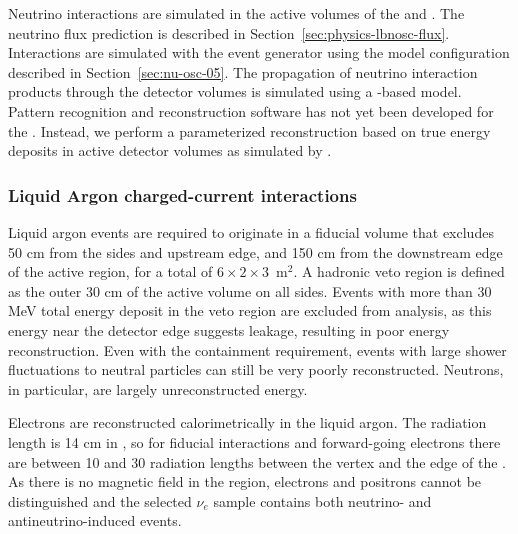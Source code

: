 Neutrino interactions are simulated in the active volumes of the  and  . The neutrino flux prediction is described in Section~\ref{sec:physics-lbnosc-flux}. Interactions are simulated with the  event generator using the model configuration described in Section~\ref{sec:nu-osc-05}. The propagation of neutrino interaction products through the detector volumes is simulated using a -based model. Pattern recognition and reconstruction software has not yet been developed for the . Instead, we perform a parameterized reconstruction based on true energy deposits in active detector volumes as simulated by .

\subsubsection{Liquid Argon charged-current interactions}

Liquid argon events are required to originate in a fiducial volume that excludes 50 cm from the sides and upstream edge, and 150 cm from the downstream edge of the active region, for a total of $6 \times 2 \times 3$~m$^{2}$. A hadronic veto region is defined as the outer 30 cm of the active volume on all sides. Events with more than 30 MeV total energy deposit in the veto region are excluded from analysis, as this energy near the detector edge suggests leakage, resulting in poor energy reconstruction. Even with the containment requirement, events with large shower fluctuations to neutral particles can still be very poorly reconstructed. Neutrons, in particular, are largely unreconstructed energy.

Electrons are reconstructed calorimetrically in the liquid argon. The radiation length is 14 cm in , so for fiducial interactions and forward-going electrons there are between 10 and 30 radiation lengths between the vertex and the edge of the . As there is no magnetic field in the   region, electrons and positrons cannot be distinguished and the selected $\nu_{e}$ sample contains both neutrino- and antineutrino-induced events.

